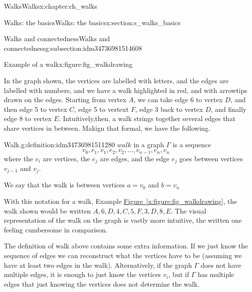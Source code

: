 \documentclass[oneside,10pt,]{book}
\newcommand{\xreffont}{\relax}
\numberwithin{equation}{section}
\begin{document}
\begin{chapterptx}{Walks}{}{Walks}{}{}{x:chapter:ch_walks}
\begin{sectionptx}{Walks: the basics}{}{Walks: the basics}{}{}{x:section:s_walks_basics}
\begin{subsectionptx}{Walks and connectedness}{}{Walks and connectedness}{}{}{g:subsection:idm34736981514608}
\begin{figureptx}{Example of a walk}{x:figure:fig_walkdrawing}{}
\begin{image}{0.15}{0.7}{0.15}
{
}%
\end{image}%
\tcblower
\end{figureptx}%
In the graph shown, the vertices are labelled with letters, and the edges are labelled with numbers, and we have a walk highlighted in red, and with arrowtips drawn on the edges.  Starting from vertex \(A\), we can take edge 6 to vertex \(D\), and then edge 5 to vertex \(C\), edge 5 to vertext \(F\), edge 3 back to vertex \(D\), and finally edge 8 to vertex \(E\). Intuitively,then, a walk strings together several edges that share vertices in between.  Makign that formal, we have the following.%
\begin{definition}{Walk.}{g:definition:idm34736981511280}%
\(walk\) in a graph \(\Gamma\) is a sequence%
%
\begin{equation*}
v_0, e_1, v_1,e_2, v_2,\dots, v_{n-1}, e_n, v_n
\end{equation*}
where the \(v_i\) are vertices, the \(e_j\) are edges, and the edge \(e_j\) goes between vertices \(v_{j-1}\) and \(v_j\).%
\par
We say that the walk is between vertices \(a=v_0\) and \(b=v_n\)%
\end{definition}
With this notation for a walk, Example \hyperref[x:figure:fig_walkdrawing]{Figure~{\xreffont\ref{x:figure:fig_walkdrawing}}}, the walk shown would be written \(A, 6, D, 4, C, 5, F, 3, D, 8, E\).  The visual representation of the walk on the graph is vastly more intuitive, the written one feeling cumbersome in comparison.%
\par
The definition of walk above contains some extra information.  If we just know the sequence of edges we can reconstruct what the vertices have to be (assuming we have at least two edges in the walk).  Alternatively, if the graph \(\Gamma\) does not have multiple edges, it is enough to just know the vertices \(v_i\), but if \(\Gamma\) has multiple edges that just knowing the vertices does not determine the walk.%

\end{subsectionptx}
\end{sectionptx}
\end{chapterptx}
\end{document}
